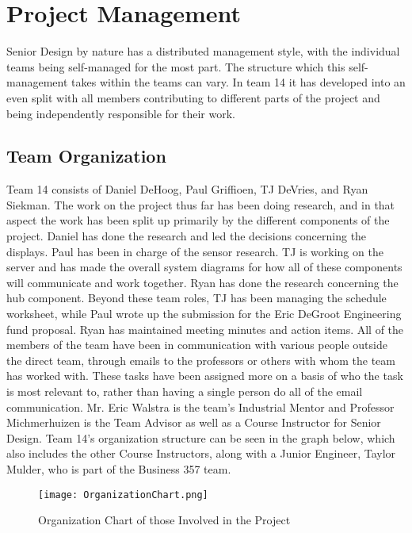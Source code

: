 \documentclass[PPFS.tex]{template/subfiles}
\begin{document}
\section{Project Management}
Senior Design by nature has a distributed management style, with the individual teams being self-managed for the most part. The structure which this self-management takes within the teams can vary. In team 14 it has developed into an even split with all members contributing to different parts of the project and being independently responsible for their work.

    \subsection{Team Organization}
	Team 14 consists of Daniel DeHoog, Paul Griffioen, TJ DeVries, and Ryan Siekman. The work on the project thus far has been doing research, and in that aspect the work has been split up primarily by the different components of the project. Daniel has done the research and led the decisions concerning the displays. Paul has been in charge of the sensor research. TJ is working on the server and has made the overall system diagrams for how all of these components will communicate and work together. Ryan has done the research concerning the hub component. Beyond these team roles, TJ has been managing the schedule worksheet, while Paul wrote up the submission for the Eric DeGroot Engineering fund proposal. Ryan has maintained meeting minutes and action items. All of the members of the team have been in communication with various people outside the direct team, through emails to the professors or others with whom the team has worked with. These tasks have been assigned more on a basis of who the task is most relevant to, rather than having a single person do all of the email communication. Mr. Eric Walstra is the team's Industrial Mentor and Professor Michmerhuizen is the Team Advisor as well as a Course Instructor for Senior Design. Team 14's organization structure can be seen in the graph below, which also includes the other Course Instructors, along with a Junior Engineer, Taylor Mulder, who is part of the Business 357 team.
	
	\begin{figure}[h]
		\centering
		\texttt{[image: OrganizationChart.png]}
		\caption{Organization Chart of those Involved in the Project}
	\end{figure}
	
\end{document}
